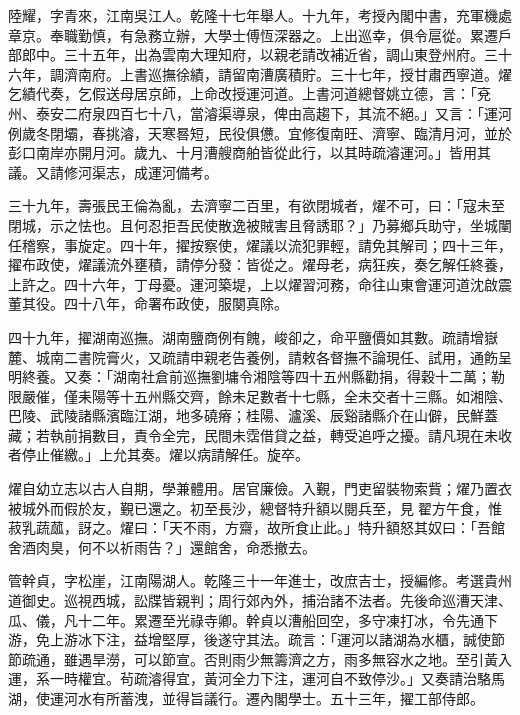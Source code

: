 \begin{pinyinscope}
陸耀，字青來，江南吳江人。乾隆十七年舉人。十九年，考授內閣中書，充軍機處章京。奉職勤慎，有急務立辦，大學士傅恆深器之。上出巡幸，俱令扈從。累遷戶部郎中。三十五年，出為雲南大理知府，以親老請改補近省，調山東登州府。三十六年，調濟南府。上書巡撫徐績，請留南漕廣積貯。三十七年，授甘肅西寧道。燿乞績代奏，乞假送母居京師，上命改授運河道。上書河道總督姚立德，言：「兗州、泰安二府泉四百七十八，當濬渠導泉，俾由高趨下，其流不絕。」又言：「運河例歲冬閉壩，春挑濬，天寒晷短，民役俱憊。宜修復南旺、濟寧、臨清月河，並於彭口南岸亦開月河。歲九、十月漕艘商舶皆從此行，以其時疏濬運河。」皆用其議。又請修河渠志，成運河備考。

三十九年，壽張民王倫為亂，去濟寧二百里，有欲閉城者，燿不可，曰：「寇未至閉城，示之怯也。且何忍拒吾民使散逸被賊害且脅誘耶？」乃募鄉兵助守，坐城闉任稽察，事旋定。四十年，擢按察使，燿議以流犯罪輕，請免其解司；四十三年，擢布政使，燿議流外壅積，請停分發：皆從之。燿母老，病狂疾，奏乞解任終養，上許之。四十六年，丁母憂。運河築堤，上以燿習河務，命往山東會運河道沈啟震董其役。四十八年，命署布政使，服闋真除。

四十九年，擢湖南巡撫。湖南鹽商例有餽，峻卻之，命平鹽價如其數。疏請增嶽麓、城南二書院膏火，又疏請申親老告養例，請敕各督撫不論現任、試用，通飭呈明終養。又奏：「湖南社倉前巡撫劉墉令湘陰等四十五州縣勸捐，得穀十二萬；勒限嚴催，僅耒陽等十五州縣交齊，餘未足數者十七縣，全未交者十三縣。如湘陰、巴陵、武陵諸縣濱臨江湖，地多磽瘠；桂陽、瀘溪、辰谿諸縣介在山僻，民鮮蓋藏；若執前捐數目，責令全完，民間未霑借貸之益，轉受追呼之擾。請凡現在未收者停止催繳。」上允其奏。燿以病請解任。旋卒。

燿自幼立志以古人自期，學兼體用。居官廉儉。入覲，門吏留裝物索貲；燿乃置衣被城外而假於友，覲已還之。初至長沙，總督特升額以閱兵至，見翟方午食，惟菽乳蔬蓏，訝之。燿曰：「天不雨，方齋，故所食止此。」特升額怒其奴曰：「吾館舍酒肉臭，何不以祈雨告？」還館舍，命悉撤去。

管幹貞，字松崖，江南陽湖人。乾隆三十一年進士，改庶吉士，授編修。考選貴州道御史。巡視西城，訟牒皆親判；周行郊內外，捕治諸不法者。先後命巡漕天津、瓜、儀，凡十二年。累遷至光祿寺卿。幹貞以漕船回空，多守凍打冰，令先通下游，免上游冰下注，益增堅厚，後遂守其法。疏言：「運河以諸湖為水櫃，誠使節節疏通，雖遇旱澇，可以節宣。否則雨少無籌濟之方，雨多無容水之地。至引黃入運，系一時權宜。茍疏濬得宜，黃河全力下注，運河自不致停沙。」又奏請治駱馬湖，使運河水有所蓄洩，並得旨議行。遷內閣學士。五十三年，擢工部侍郎。


\end{pinyinscope}
